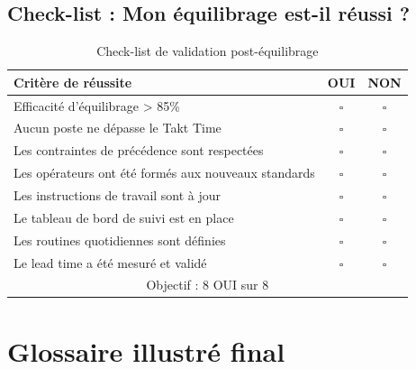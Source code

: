 \documentclass[12pt,a4paper]{article}
\begin{document}
\begin{center}
\subsection{Check-list : Mon équilibrage est-il réussi ?}

\begin{table}[H]
\centering
\caption{Check-list de validation post-équilibrage}
\label{tab:checklist_validation}
\begin{tabular}{|l|c|c|}
\hline
\textbf{Critère de réussite} & \textbf{OUI} & \textbf{NON} \\ \hline
Efficacité d'équilibrage > 85\% & $\square$ & $\square$ \\
Aucun poste ne dépasse le Takt Time & $\square$ & $\square$ \\
Les contraintes de précédence sont respectées & $\square$ & $\square$ \\
Les opérateurs ont été formés aux nouveaux standards & $\square$ & $\square$ \\
Les instructions de travail sont à jour & $\square$ & $\square$ \\
Le tableau de bord de suivi est en place & $\square$ & $\square$ \\
Les routines quotidiennes sont définies & $\square$ & $\square$ \\
Le lead time a été mesuré et validé & $\square$ & $\square$ \\
\hline
\multicolumn{3}{|c|}{Objectif : 8 OUI sur 8} \\
\hline
\end{tabular}
\end{table}

\section{Glossaire illustré final}


\end{center}
\end{document}
